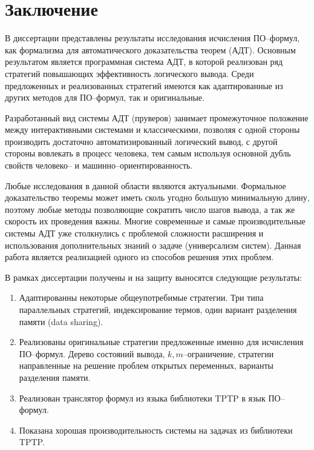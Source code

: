 \chapter*{Заключение}

В диссертации представлены результаты исследования исчисления ПО--формул, как формализма для автоматического доказательства теорем (АДТ). Основным результатом является программная система АДТ, в которой реализован ряд стратегий повышающих эффективность логического вывода. Среди предложенных и реализованных стратегий имеются как адаптированные из других методов для ПО--формул, так и оригинальные.

Разработанный вид системы АДТ (пруверов) занимает промежуточное положение между интерактивными системами и классическими, позволяя с одной стороны производить достаточно автоматизированный логический вывод, с другой стороны вовлекать в процесс человека, тем самым используя основной дубль свойств человеко-- и машинно--ориентированность.

Любые исследования в данной области являются актуальными. Формальное доказательство теоремы может иметь сколь угодно большую минимальную длину, поэтому любые методы позволяющие сократить число шагов вывода, а так же скорость их проведения важны. Многие современные и самые производительные системы АДТ уже столкнулись с проблемой сложности расширения и использования дополнительных знаний о задаче (универсализм систем). Данная работа является реализацией одного из способов решения этих проблем.


В рамках диссертации получены и на защиту выносятся следующие результаты:
\begin{enumerate}
\item Адаптированны некоторые общеупотребимые стратегии. Три типа параллельных стратегий, индексирование термов, один вариант разделения памяти (data sharing).
\item Реализованы оригинальные стратегии предложенные именно для исчисления ПО--формул. Дерево состояний вывода, $k,m$--ограничение, стратегии направленные на решение проблем открытых переменных, варианты разделения памяти.
\item Реализован транслятор формул из языка библиотеки TPTP в язык ПО--формул.
\item Показана хорошая производительность системы на задачах из библиотеки TPTP.
\end{enumerate}

